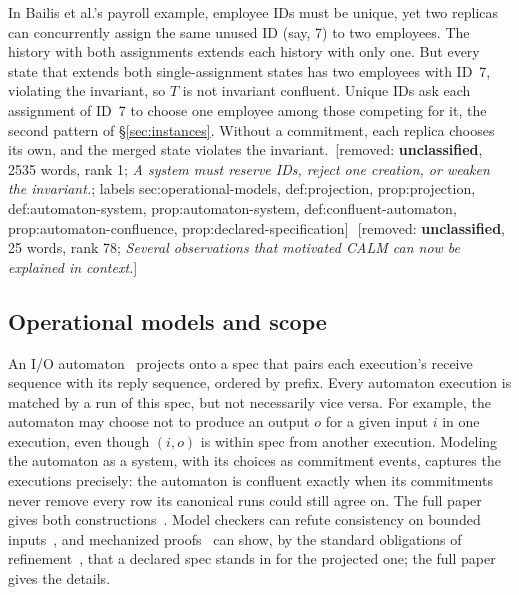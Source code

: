 \documentclass[sigconf]{cidr-2027}
\theoremstyle{remark}
\newcommand{\commitment}{commitment\xspace}
\newcommand{\commitments}{commitments\xspace}
\newcommand{\inrel}{extends\xspace}          %
\newcommand{\outrel}{extends\xspace}          %
\newcommand{\extended}{the full paper~\cite{hellerstein2026completecalmfull}}
\newif\ifshowrv \showrvfalse
\newcommand{\rv}[1]{\ifshowrv\textsuperscript{\textcolor{magenta}{\textbf{R#1}}}\fi}
\newcommand{\removednote}[1]{{\color{cutred}\footnotesize\,[removed: #1]\,}}
\begin{document}
\textcolor{newblue}{In Bailis et al.'s payroll example, employee IDs must be unique, yet two
replicas can concurrently assign the same unused ID (say, 7) to two employees.} \textcolor{newblue}{The history with both assignments \inrel each history with only one.} \textcolor{newblue}{But every state that \outrel both single-assignment
states has two employees with ID~7, violating the invariant, so $T$ is not
invariant confluent.} \textcolor{newblue}{Unique IDs ask each assignment of ID~7 to choose one
employee among those competing for it, the second pattern of
\S\ref{sec:instances}.} Without a \commitment, each replica chooses its own,
and the merged state violates the invariant. \removednote{\textbf{unclassified}, 2535 words, rank 1; \textit{A system must reserve IDs, reject one creation, or weaken the invariant.}; labels sec:operational-models, def:projection, prop:projection, def:automaton-system, prop:automaton-system, def:confluent-automaton, prop:automaton-confluence, prop:declared-specification} \removednote{\textbf{unclassified}, 25 words, rank 78; \textit{Several observations that motivated CALM can now be explained in context.}}

\subsection{Operational models and scope}
\label{sec:scope}

\textcolor{newblue}{An I/O automaton~\cite{lynch1987io} projects onto a spec that pairs each
execution's receive sequence with its reply sequence, ordered by prefix.} \textcolor{newblue}{Every automaton execution is matched by a run of this spec, but not
necessarily vice versa.} \textcolor{newblue}{For example, the automaton may choose not to produce
an output $o$ for a given input $i$ in one execution, even though $(i,o)$ is
within spec from another execution.} \textcolor{newblue}{Modeling the automaton as a system, with
its choices as \commitment events, captures the executions precisely: the
automaton is confluent exactly when its \commitments never remove every row
its canonical runs could still agree on.} \textcolor{newblue}{The full paper gives both
constructions~\cite{hellerstein2026completecalmfull}.\rv{2}
Model checkers can refute
consistency on bounded inputs~\cite{newcombe2015aws}, and mechanized
proofs~\cite{hawblitzel2015ironfleet} can show, by the standard obligations of
refinement~\cite{abadi1991refinement}, that a declared spec stands in for the
projected one; \extended{} gives the details.}
\end{document}
